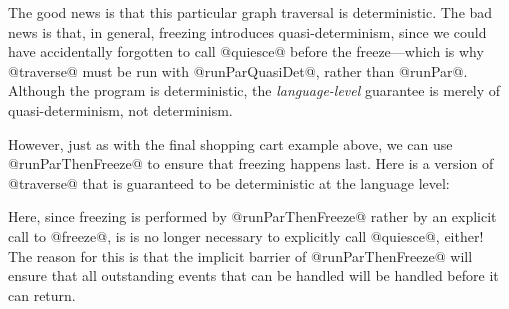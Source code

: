 The good news is that this particular graph traversal is
deterministic.  The bad news is that, in general, freezing introduces
quasi-determinism, since we could have accidentally forgotten to call
@quiesce@ before the freeze---which is why @traverse@ must be run with
@runParQuasiDet@, rather than @runPar@.  Although the program is
deterministic, the \emph{language-level} guarantee is merely of
quasi-determinism, not determinism.

However, just as with the final shopping cart example above, we can
use @runParThenFreeze@ to ensure that freezing happens last.  Here is
a version of @traverse@ that is guaranteed to be deterministic at the
language level:

\singlespacing

\doublespacing

Here, since freezing is performed by @runParThenFreeze@ rather by an
explicit call to @freeze@, is is no longer necessary to explicitly
call @quiesce@, either!  The reason for this is that the implicit
barrier of @runParThenFreeze@ will ensure that all outstanding events
that can be handled will be handled before it can return.
